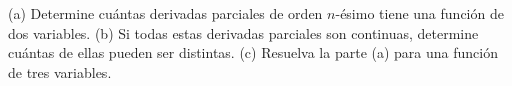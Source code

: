 \item (a) Determine cuántas derivadas parciales de orden $n$-ésimo tiene una función de dos variables. (b) Si todas estas derivadas parciales son continuas, determine cuántas de ellas pueden ser distintas. (c) Resuelva la parte (a) para una función de tres variables.
